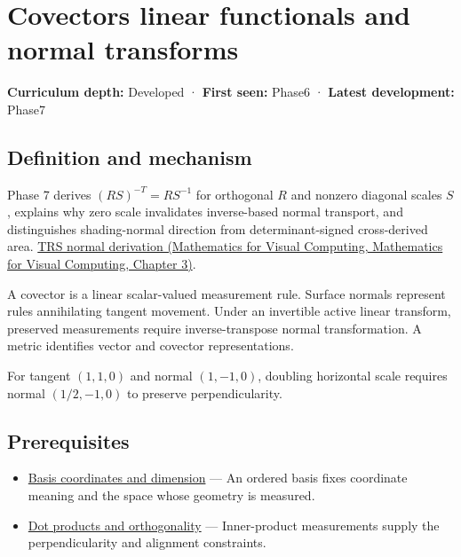 \hypertarget{appendix-46da295c6787}{}\label{referencestart:appendix-46da295c6787}
\section{Covectors linear functionals and normal transforms}\label{appendix-46da295c6787-covectors-linear-functionals-and-normal-transforms}

\textbf{Curriculum depth:} Developed · \textbf{First seen:} Phase6 · \textbf{Latest development:} Phase7

\subsection{Definition and mechanism}\label{appendix-46da295c6787-definition-and-mechanism}

Phase 7 derives \((RS)^{-T}=RS^{-1}\) for orthogonal \(R\) and nonzero diagonal scales \(S\), explains why zero scale invalidates inverse-based normal transport, and distinguishes shading-normal direction from determinant-signed cross-derived area. \href{../02-Mathematics-for-Visual-Computing/main.pdf\#nameddest=01-foundations-i-ch019-normals-undo-scale-before-following-rotation}{TRS normal derivation (Mathematics for Visual Computing, Mathematics for Visual Computing, Chapter 3)}.

A covector is a linear scalar-valued measurement rule. Surface normals represent rules annihilating tangent movement. Under an invertible active linear transform, preserved measurements require inverse-transpose normal transformation. A metric identifies vector and covector representations.

For tangent \((1,1,0)\) and normal \((1,-1,0)\), doubling horizontal scale requires normal \((1/2,-1,0)\) to preserve perpendicularity.

\subsection{Prerequisites}\label{appendix-46da295c6787-prerequisites}

\begin{itemize}
\tightlist
\item
  \hyperref[appendix-ce0341f7ea0d]{Basis coordinates and dimension} --- An ordered basis fixes coordinate meaning and the space whose geometry is measured.
\item
  \hyperref[appendix-8bc4e8fc547c]{Dot products and orthogonality} --- Inner-product measurements supply the perpendicularity and alignment constraints.
\end{itemize}

